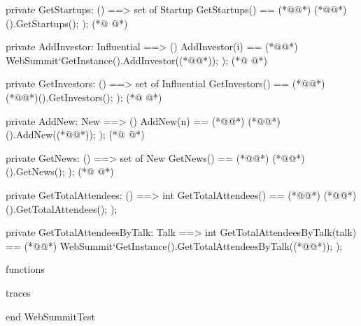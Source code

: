 \begin{vdmpp}[breaklines=true]
 private GetStartups: () ==> set of Startup
 GetStartups() == (*@\vdmnotcovered{(}@*)
  (*@@*)().GetStartups();
 );  
(*@
\label{GetInvestors:513}
@*)
 
 private AddInvestor: Influential ==> ()
 AddInvestor(i) == (*@\vdmnotcovered{(}@*)
  WebSummit`GetInstance().AddInvestor((*@@*));
 );
(*@
\label{AddNew:518}
@*)
 
 private GetInvestors: () ==> set of Influential
 GetInvestors() == (*@\vdmnotcovered{(}@*)
  (*@@*)().GetInvestors();
 );
(*@
\label{GetNews:523}
@*)
 
 private AddNew: New ==> ()
 AddNew(n) == (*@\vdmnotcovered{(}@*)
  (*@@*)().AddNew((*@@*));
 ); 
(*@
\label{GetTotalAttendees:528}
@*)
 
 private GetNews: () ==> set of New
 GetNews() == (*@\vdmnotcovered{(}@*)
  (*@@*)().GetNews();
 );
(*@
\label{GetTotalAttendeesByTalk:533}
@*)
 
 private GetTotalAttendees: () ==> int
 GetTotalAttendees() == (*@\vdmnotcovered{(}@*)
  (*@@*)().GetTotalAttendees();
 );
 
 private GetTotalAttendeesByTalk: Talk ==> int
 GetTotalAttendeesByTalk(talk) == (*@\vdmnotcovered{(}@*)
  WebSummit`GetInstance().GetTotalAttendeesByTalk((*@@*));
 ); 
 
functions

traces

end WebSummitTest
\end{vdmpp}
\bigskip
